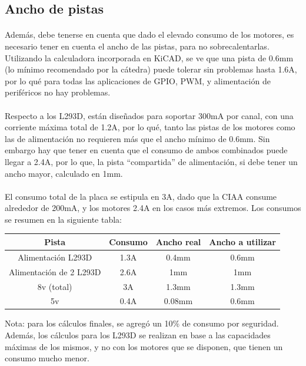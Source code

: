 \subsection{Ancho de pistas}

\paragraph{} Además, debe tenerse en cuenta que dado el elevado consumo de los motores, es necesario tener en cuenta el ancho de las pistas, para no sobrecalentarlas. Utilizando la calculadora incorporada en KiCAD, se ve que una pista de 0.6mm (lo mínimo recomendado por la cátedra) puede tolerar sin problemas hasta 1.6A, por lo qué para todas las aplicaciones de GPIO, PWM, y alimentación de periféricos no hay problemas.

\paragraph{}Respecto a los L293D, están diseñados para soportar 300mA por canal, con una corriente máxima total de 1.2A, por lo qué, tanto las pistas de los motores como las de alimentación no requieren más que el ancho mínimo de 0.6mm. Sin embargo hay que tener en cuenta que el consumo de ambos combinados puede llegar a 2.4A, por lo que, la pista ``compartida'' de alimentación, si debe tener un ancho mayor, calculado en 1mm.

\paragraph{}El consumo total de la placa se estipula en 3A, dado que la CIAA consume alrededor de 200mA, y los motores 2.4A en los casos más extremos. Los consumos se resumen en la siguiente tabla:

\begin{longtable}[]{|c|c|c|c|}
	\toprule
	Pista & Consumo & Ancho real & Ancho a utilizar \tabularnewline
	\midrule
	Alimentación L293D & 1.3A & 0.4mm & 0.6mm \tabularnewline
	Alimentación de 2 L293D & 2.6A & 1mm & 1mm\tabularnewline
	8v (total) & 3A & 1.3mm & 1.3mm\tabularnewline
	5v & 0.4A & 0.08mm & 0.6mm\tabularnewline
	\endhead
	
	\bottomrule
\end{longtable}

Nota: para los cálculos finales, se agregó un 10\% de consumo por seguridad. Además, los cálculos para los L293D se realizan en base a las capacidades máximas de los mismos, y no con los motores que se disponen, que tienen un consumo mucho menor.

